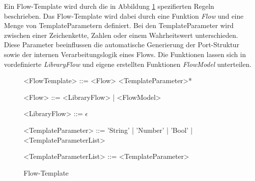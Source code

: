 \documentclass{article}
\begin{document}
    Ein Flow-Template wird durch die in Abbildung \ref{Flow-Template} spezifierten Regeln beschrieben.
    Das Flow-Template wird dabei durch eine Funktion \textit{Flow} und eine Menge von TemplateParametern definiert. 
    Bei den TemplateParameter wird zwischen einer Zeichenkette, Zahlen oder einem Wahrheitswert unterschieden. 
    Diese Parameter beeinflussen die automatische Generierung der Port-Struktur sowie der internen Verarbeitungslogik eines Flows. \cite{99}
    Die Funktionen lassen sich in vordefinierte \textit{LibraryFlow} und eigene erstellten Funktionen \textit{FlowModel} unterteilen.\\
    \begin{figure}[H]
        \begin{grammar}
            <FlowTemplate> ::= <Flow> <TemplateParameter>*

            <Flow> ::= <LibraryFlow> | <FlowModel>
            
            <LibraryFlow> ::= $\epsilon$

            <TemplateParameter> ::= 'String' | 'Number' | 'Bool' | <TemplateParameterList>
            
            <TemplateParameterList> ::= <TemplateParameter>
        \end{grammar}
        \caption{Flow-Template}
        \label{Flow-Template}
    \end{figure}
\end{document}
